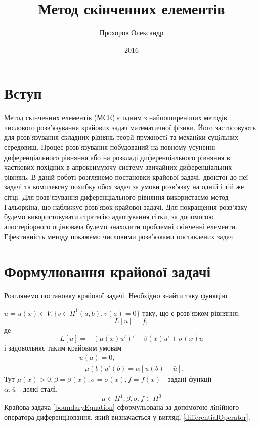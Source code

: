 \documentclass[a4paper]{article}
\title{Метод скінченних елементів}
\author{Прохоров Олександр}
\date{2016}
\numberwithin{equation}{section}
\begin{document}
\hfill
\tableofcontents
\newpage
\section{Вступ}
Метод скінченних елементів (МСЕ) є одним з найпоширеніших методів числового розв’язування крайових задач математичної фізики. Його застосовують для розв’язування складних рiвнянь теорiї пружностi та механiки суцiльних середовищ. Процес розв’язування побудований на повному усуненні диференціального рівняння або на розкладі диференціального рівняння в часткових похід\-них в апроксимуючу систему звичайних диференціальних рівнянь.
В даній роботі розглянемо постановки крайової задачі, двоїстої до неї задачі та комплексну похибку обох задач за умови розв'язку на одній і тій же сітці.
Для розв’язування диференці\-ального рівняння використаємо метод Гальоркіна, що наближує розв’язок крайової задачі. Для покращення розв’язку будемо використовувати стратегію адаптування сітки, за допомогою апосте\-ріорного оцінювача будемо знаходити проблемні скінченні елементи. Ефективність методу покаже\-мо числовими розв’язками поставлених задач.

\section{Формулювання крайової задачі}
Розглянемо постановку крайової задачі. Необхідно знайти таку функцію

 $u=u(x) \in V : \{ v \in H^1(a,b), v(a) = 0 \}$  таку, що є розв’язком рівняння:
\begin{equation}\label{boundaryEquation}
L[u]=f,
\end{equation}
де
\begin{equation}\label{differentialOperator}
L[u]=-(\mu(x)u')'+\beta(x)u'+\sigma(x)u
\end{equation}
і задовольняє таким крайовим умовам
\begin{equation}\label{boundaryCondition}
\begin{split}
u(a)=0,\\
-\mu(b)u'(b)=\alpha[u(b)-\bar{u}].
\end{split}
\end{equation}
Тут $\mu(x)>0, \beta=\beta(x), \sigma=\sigma(x),f=f(x)$ - задані функції\\
$\alpha, \bar{u}$ - деякі сталі.
\begin{equation}
\mu \in H^1, \beta, \sigma, f\in H^0
\end{equation}
Крайова задача \ref{boundaryEquation} сформульована за допомогою лiнiйного оператора диференцiювання, який визначається у виглядi \ref{differentialOperator}.
\end{document}
